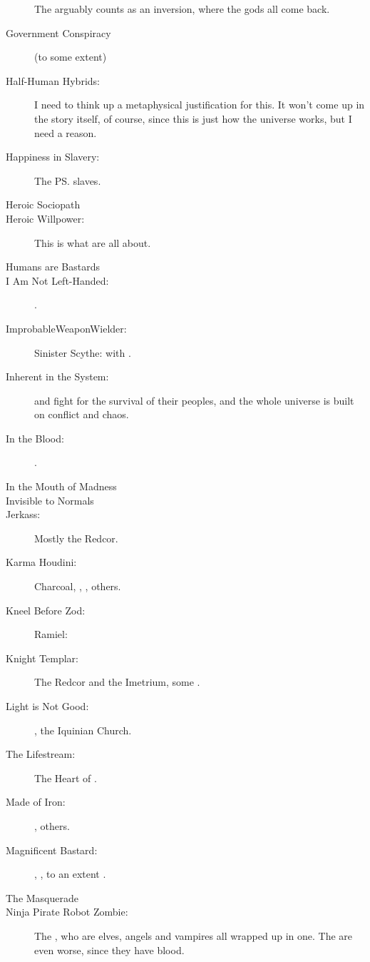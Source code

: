 \begin{flushleft}
\begin{description}
    The \thirdbanewar arguably counts as an inversion, where the gods all come back. 
    
  \item[Government Conspiracy] (to some extent)
  \item[Half-Human Hybrids:] 
    I need to think up a metaphysical justification for this. It won't come up in the story itself, of course, since this is just how the \Miith{} universe works, but I need a reason.
  \item[Happiness in Slavery:] The \ps{\resphain} \human{} slaves.
  \item[Heroic Sociopath] 
  \item[Heroic Willpower:] This is what \vertices{} are all about. 
  \item[Humans are Bastards] 
  \item[I Am Not Left-Handed:] \Ishnaruchaefir. 
  \item[ImprobableWeaponWielder:]
    \subitem Sinister Scythe: \Ishnaruchaefir{} with \Triestessakhin. 
  \item[Inherent in the System:] 
    \Dragons{} and \banes{} fight for the survival of their peoples, and the whole universe is built on conflict and chaos.
  \item[In the Blood:] .
  \item[In the Mouth of Madness] 
  \item[Invisible to Normals]
  \item[Jerkass:] Mostly the Redcor. 
  \item[Karma Houdini:] Charcoal, \Nzessuacrith, \HriistD, others. 
  \item[Kneel Before Zod:] 
    Ramiel: 
  \item[Knight Templar:] The Redcor and the Imetrium, some \resphain.
  \item[Light is Not Good:] \Teshrial, the Iquinian Church. 
  \item[The Lifestream:] The Heart of \Miith{}.
  \item[Made of Iron:] \Ishnaruchaefir, others. 
  \item[Magnificent Bastard:] \Daggerrain, \Secherdamon, to an extent \Ishnaruchaefir.
  \item[The Masquerade]
  \item[Ninja Pirate Robot Zombie:] 
    The \resphain, who are elves, angels and vampires all wrapped up in one. 
    The \satharioth{} are even worse, since they have \dragon{} blood.

\end{description}
\end{flushleft}
